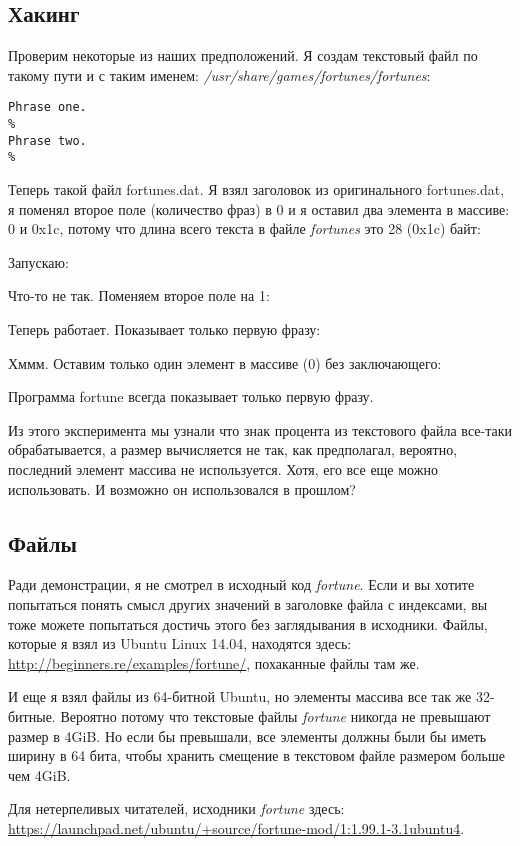 \subsection{Хакинг}

Проверим некоторые из наших предположений.
Я создам текстовый файл по такому пути и с таким именем: \emph{/usr/share/games/fortunes/fortunes}:

\begin{lstlisting}
Phrase one.
%
Phrase two.
%
\end{lstlisting}

Теперь такой файл fortunes.dat. Я взял заголовок из оригинального fortunes.dat, я поменял второе поле
(количество фраз) в 0 и я оставил два элемента в массиве:
0 и 0x1c, потому что длина всего текста в файле \emph{fortunes} это 28 (0x1c) байт:



Запускаю:



Что-то не так. Поменяем второе поле на 1:



Теперь работает. Показывает только первую фразу:



Хммм. Оставим только один элемент в массиве (0) без заключающего:



Программа fortune всегда показывает только первую фразу.

Из этого эксперимента мы узнали что знак процента из текстового файла все-таки обрабатывается, а размер вычисляется
не так, как предполагал, вероятно, последний элемент массива не используется.
Хотя, его все еще можно использовать. И возможно он использовался в прошлом?


\subsection{Файлы}

Ради демонстрации, я не смотрел в исходный код \emph{fortune}.
Если и вы хотите попытаться понять смысл других значений в заголовке файла с индексами, вы тоже можете попытаться
достичь этого без заглядывания в исходники.
Файлы, которые я взял из Ubuntu Linux 14.04, находятся здесь: \url{http://beginners.re/examples/fortune/}, похаканные
файлы там же.

И еще я взял файлы из 64-битной Ubuntu, но элементы массива все так же 32-битные.
Вероятно потому что текстовые файлы \emph{fortune} никогда не превышают размер в 4\ac{GiB}.
Но если бы превышали, все элементы должны были бы иметь ширину в 64 бита, чтобы хранить смещение в текстовом файле
размером больше чем 4GiB.

Для нетерпеливых читателей, исходники \emph{fortune} здесь:
\url{https://launchpad.net/ubuntu/+source/fortune-mod/1:1.99.1-3.1ubuntu4}.

